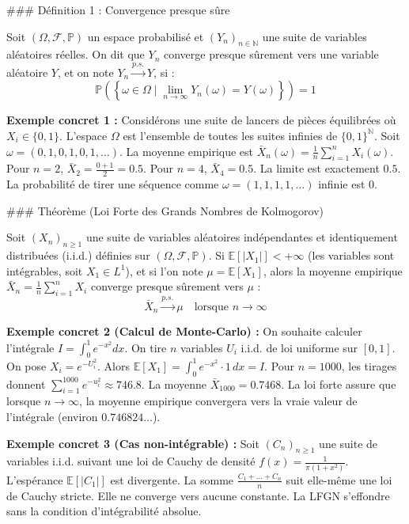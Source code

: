 \documentclass[11pt,a4paper]{article}
\begin{document}
\#\#\# Définition 1 : Convergence presque sûre

Soit $(\Omega, \mathcal{F}, \mathbb{P})$ un espace probabilisé et $(Y_n)_{n \in \mathbb{N}}$ une suite de variables aléatoires réelles. On dit que $Y_n$ converge presque sûrement vers une variable aléatoire $Y$, et on note $Y_n \xrightarrow{p.s.} Y$, si :
$$ \mathbb{P}\left(\left\{\omega \in \Omega \mid \lim_{n \to \infty} Y_n(\omega) = Y(\omega)\right\}\right) = 1 $$

\textbf{Exemple concret 1 :}
Considérons une suite de lancers de pièces équilibrées où $X_i \in \{0, 1\}$.
L'espace $\Omega$ est l'ensemble de toutes les suites infinies de $\{0, 1\}^{\mathbb{N}}$.
Soit $\omega = (0, 1, 0, 1, 0, 1, \dots)$.
La moyenne empirique est $\bar{X}_n(\omega) = \frac{1}{n} \sum_{i=1}^n X_i(\omega)$.
Pour $n=2$, $\bar{X}_2 = \frac{0+1}{2} = 0.5$.
Pour $n=4$, $\bar{X}_4 = 0.5$.
La limite est exactement $0.5$. La probabilité de tirer une séquence comme $\omega = (1, 1, 1, 1, \dots)$ infinie est $0$.

\#\#\# Théorème (Loi Forte des Grands Nombres de Kolmogorov)

Soit $(X_n)_{n \ge 1}$ une suite de variables aléatoires indépendantes et identiquement distribuées (i.i.d.) définies sur $(\Omega, \mathcal{F}, \mathbb{P})$.
Si $\mathbb{E}[|X_1|] < +\infty$ (les variables sont intégrables, soit $X_1 \in L^1$), et si l'on note $\mu = \mathbb{E}[X_1]$, alors la moyenne empirique $\bar{X}_n = \frac{1}{n}\sum_{i=1}^n X_i$ converge presque sûrement vers $\mu$ :
$$ \bar{X}_n \xrightarrow{p.s.} \mu \quad \text{lorsque } n \to \infty $$

\textbf{Exemple concret 2 (Calcul de Monte-Carlo) :}
On souhaite calculer l'intégrale $I = \int_0^1 e^{-x^2} dx$.
On tire $n$ variables $U_i$ i.i.d. de loi uniforme sur $[0,1]$. On pose $X_i = e^{-U_i^2}$.
Alors $\mathbb{E}[X_1] = \int_0^1 e^{-x^2} \cdot 1 \,dx = I$.
Pour $n=1000$, les tirages donnent $\sum_{i=1}^{1000} e^{-u_i^2} \approx 746.8$.
La moyenne $\bar{X}_{1000} = 0.7468$.
La loi forte assure que lorsque $n \to \infty$, la moyenne empirique convergera vers la vraie valeur de l'intégrale (environ $0.746824\dots$).

\textbf{Exemple concret 3 (Cas non-intégrable) :}
Soit $(C_n)_{n \ge 1}$ une suite de variables i.i.d. suivant une loi de Cauchy de densité $f(x) = \frac{1}{\pi(1+x^2)}$.
L'espérance $\mathbb{E}[|C_1|]$ est divergente.
La somme $\frac{C_1 + \dots + C_n}{n}$ suit elle-même une loi de Cauchy stricte. Elle ne converge vers aucune constante. La LFGN s'effondre sans la condition d'intégrabilité absolue.
\end{document}
